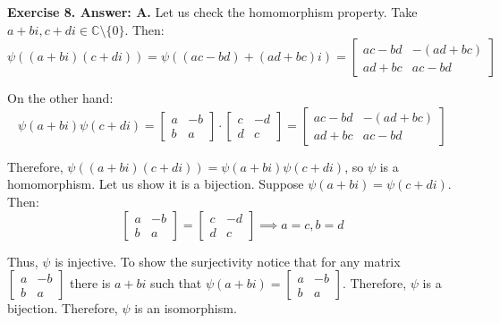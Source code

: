 \documentclass[../lecture-notes-148x210.tex]{subfiles}
\begin{document}
\textbf{Exercise 8. Answer: A.} Let us check the homomorphism property. Take 
$a+bi,c+di \in \mathbb{C} \setminus \{0\}$. Then:
\begin{equation*}
    \psi((a+bi)(c+di)) = \psi((ac-bd)+(ad+bc)i) = \begin{bmatrix}
        ac-bd & -(ad+bc) \\ ad+bc & ac-bd
    \end{bmatrix}
\end{equation*}

On the other hand:
\begin{equation*}
    \psi(a+bi)\psi(c+di) = \begin{bmatrix}
        a & -b \\ b & a
    \end{bmatrix}\cdot \begin{bmatrix}
        c & -d \\ d & c
    \end{bmatrix} = \begin{bmatrix}
        ac-bd & -(ad+bc) \\ ad+bc & ac-bd
    \end{bmatrix}
\end{equation*}

Therefore, $\psi((a+bi)(c+di))=\psi(a+bi)\psi(c+di)$, so $\psi$ is a homomorphism.
Let us show it is a bijection. Suppose $\psi(a+bi)=\psi(c+di)$. Then:
\begin{equation*}
    \begin{bmatrix}
        a & -b \\ b & a
    \end{bmatrix} = \begin{bmatrix}
        c & -d \\ d & c
    \end{bmatrix} \implies a=c, b=d
\end{equation*}

Thus, $\psi$ is injective. To show the surjectivity notice that for any matrix
$\begin{bmatrix} a & -b \\ b & a \end{bmatrix}$ there is $a+bi$ such that
$\psi(a+bi)=\begin{bmatrix} a & -b \\ b & a \end{bmatrix}$. Therefore, $\psi$ is
a bijection. Therefore, $\psi$ is an isomorphism.
\end{document}
